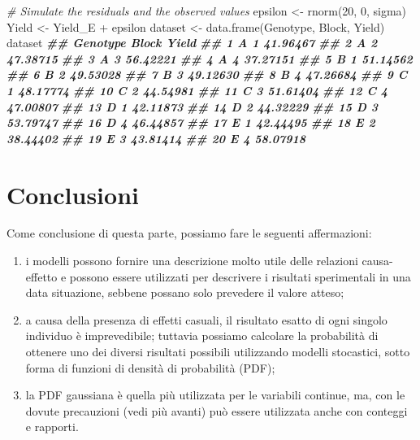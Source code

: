 \documentclass[
  12pt,
]{book}
\newenvironment{Shaded}{\begin{snugshade}}{\end{snugshade}}
\newcommand{\CommentTok}[1]{\textcolor[rgb]{0.56,0.35,0.01}{\textit{#1}}}
\newcommand{\DecValTok}[1]{\textcolor[rgb]{0.00,0.00,0.81}{#1}}
\newcommand{\DocumentationTok}[1]{\textcolor[rgb]{0.56,0.35,0.01}{\textbf{\textit{#1}}}}
\newcommand{\FunctionTok}[1]{\textcolor[rgb]{0.00,0.00,0.00}{#1}}
\newcommand{\NormalTok}[1]{#1}
\newcommand{\OtherTok}[1]{\textcolor[rgb]{0.56,0.35,0.01}{#1}}
\newcommand{\SpecialCharTok}[1]{\textcolor[rgb]{0.00,0.00,0.00}{#1}}
\providecommand{\tightlist}{%
  \setlength{\itemsep}{0pt}\setlength{\parskip}{0pt}}
\begin{document}
\begin{Shaded}
\begin{Highlighting}[]
\CommentTok{\# Simulate the residuals and the observed values}
\NormalTok{epsilon }\OtherTok{\textless{}{-}} \FunctionTok{rnorm}\NormalTok{(}\DecValTok{20}\NormalTok{, }\DecValTok{0}\NormalTok{, sigma)}
\NormalTok{Yield }\OtherTok{\textless{}{-}}\NormalTok{ Yield\_E }\SpecialCharTok{+}\NormalTok{ epsilon}
\NormalTok{dataset }\OtherTok{\textless{}{-}} \FunctionTok{data.frame}\NormalTok{(Genotype, Block, Yield)}
\NormalTok{dataset}
\DocumentationTok{\#\#    Genotype Block    Yield}
\DocumentationTok{\#\# 1         A     1 41.96467}
\DocumentationTok{\#\# 2         A     2 47.38715}
\DocumentationTok{\#\# 3         A     3 56.42221}
\DocumentationTok{\#\# 4         A     4 37.27151}
\DocumentationTok{\#\# 5         B     1 51.14562}
\DocumentationTok{\#\# 6         B     2 49.53028}
\DocumentationTok{\#\# 7         B     3 49.12630}
\DocumentationTok{\#\# 8         B     4 47.26684}
\DocumentationTok{\#\# 9         C     1 48.17774}
\DocumentationTok{\#\# 10        C     2 44.54981}
\DocumentationTok{\#\# 11        C     3 51.61404}
\DocumentationTok{\#\# 12        C     4 47.00807}
\DocumentationTok{\#\# 13        D     1 42.11873}
\DocumentationTok{\#\# 14        D     2 44.32229}
\DocumentationTok{\#\# 15        D     3 53.79747}
\DocumentationTok{\#\# 16        D     4 46.44857}
\DocumentationTok{\#\# 17        E     1 42.44495}
\DocumentationTok{\#\# 18        E     2 38.44402}
\DocumentationTok{\#\# 19        E     3 43.81414}
\DocumentationTok{\#\# 20        E     4 58.07918}
\end{Highlighting}
\end{Shaded}

\normalsize

\hypertarget{conclusioni-2}{%
\section{Conclusioni}\label{conclusioni-2}}

Come conclusione di questa parte, possiamo fare le seguenti affermazioni:

\begin{enumerate}
\def\labelenumi{\arabic{enumi}.}
\tightlist
\item
  i modelli possono fornire una descrizione molto utile delle relazioni causa-effetto e possono essere utilizzati per descrivere i risultati sperimentali in una data situazione, sebbene possano solo prevedere il valore atteso;
\item
  a causa della presenza di effetti casuali, il risultato esatto di ogni singolo individuo è imprevedibile; tuttavia possiamo calcolare la probabilità di ottenere uno dei diversi risultati possibili utilizzando modelli stocastici, sotto forma di funzioni di densità di probabilità (PDF);
\item
  la PDF gaussiana è quella più utilizzata per le variabili continue, ma, con le dovute precauzioni (vedi più avanti) può essere utilizzata anche con conteggi e rapporti.
\end{enumerate}
\end{document}
